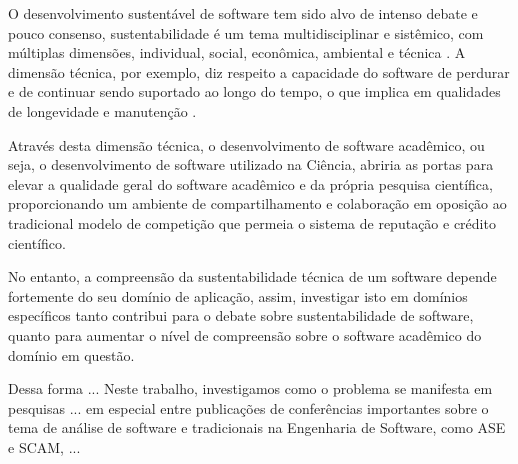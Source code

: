 

O desenvolvimento sustentável de software
tem sido alvo de intenso debate e pouco consenso, sustentabilidade é
um tema multidisciplinar e
sistêmico, com múltiplas dimensões, individual, social, econômica,
ambiental e técnica \cite{becker2014karlskrona}. A dimensão técnica, por
exemplo, diz respeito a capacidade do software de perdurar e de continuar sendo
suportado ao longo do tempo, o que implica em qualidades de longevidade e
manutenção \cite{venters2014software}.

Através desta dimensão técnica, o desenvolvimento de software acadêmico, ou
seja, o desenvolvimento de software utilizado na Ciência, abriria as portas
para elevar a qualidade geral do software acadêmico e da própria pesquisa científica, proporcionando
um ambiente de compartilhamento e colaboração em oposição ao tradicional modelo
de competição que permeia o sistema de reputação e crédito científico.


No entanto, a compreensão da sustentabilidade técnica de um software depende
fortemente do seu domínio de aplicação, assim, investigar isto em domínios
específicos tanto contribui para o debate sobre sustentabilidade de software,
quanto para aumentar o nível de compreensão sobre o software acadêmico do
domínio em questão.

Dessa forma ...
Neste trabalho, investigamos como
o problema se manifesta em pesquisas ... em especial entre publicações de
conferências importantes sobre o tema de análise de software e tradicionais
na Engenharia de Software, como ASE e SCAM, ...


